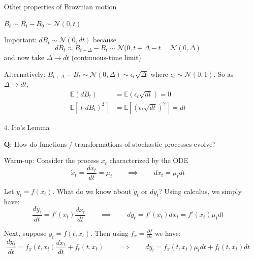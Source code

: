 \documentclass[11pt, aspectratio=169]{beamer}
\newenvironment{witemize}{\itemize\addtolength{\itemsep}{10pt}}{\enditemize}
\begin{document}
\begin{frame}{Other properties of Brownian motion}
\begin{witemize}
\item $B_t \sim B_t - B_0 \sim \mathcal N(0, t)$

\item Important: $dB_t \sim \mathcal N(0, dt)$ because 
\begin{equation*}
	dB_t \approx B_{t + \Delta} - B_t \sim \mathcal N(0, t +\Delta - t = \mathcal N(0, \Delta)
\end{equation*}
and now take $\Delta \to dt$ (continuous-time limit)

\item Alternatively: $B_{t + \Delta} - B_t \sim \mathcal N(0, \Delta) \sim \epsilon_t \sqrt{\Delta}$ where $\epsilon_t \sim \mathcal N(0, 1)$. So as $\Delta \to dt$,
\begin{align*}
	\mathbb E(dB_t) &= \mathbb E(\epsilon_t \sqrt{dt}) = 0 \\
	\mathbb E[(dB_t)^2] &= \mathbb E[(\epsilon_t \sqrt{dt})^2] = dt
\end{align*}
\end{witemize}
\end{frame}



\begin{frame}{4. Ito's Lemma}

\begin{witemize}
\item \textbf{Q}: How do functions / transformations of stochastic processes evolve?

\item Warm-up: Consider the process $x_t$ characterized by the ODE
\begin{equation*}
	\dot x_t = \frac{d x_t}{dt} = \mu_t 
	\quad\quad \implies \quad\quad
	dx_t = \mu_t dt
\end{equation*}

\item Let $y_t = f(x_t)$. What do we know about $\dot y_t$ or $dy_t$? Using calculus, we simply have:
\begin{equation*}
	\frac{dy_t}{dt} = f'(x_t) \frac{dx_t}{dt} 
	\quad\quad \implies \quad\quad
	dy_t = f'(x_t) dx_t = f'(x_t) \mu_t dt
\end{equation*}

\item Next, suppose $y_t = f(t, x_t)$. Then using $f_x = \frac{\partial f}{\partial x}$ we have:
\begin{equation*}
	\frac{dy_t}{dt} = f_x(t, x_t) \frac{dx_t}{dt} + f_t(t, x_t)
	\quad\quad \implies \quad\quad
	dy_t = f_x(t, x_t) \mu_t dt + f_t(t, x_t) dt
\end{equation*}
\end{witemize}
\end{frame}
\end{document}
